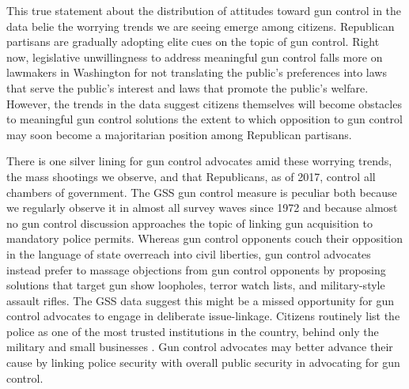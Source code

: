 \documentclass[11pt,]{article}
\begin{document}
This true statement about the distribution of attitudes toward gun
control in the data belie the worrying trends we are seeing emerge among
citizens. Republican partisans are gradually adopting elite cues on the
topic of gun control. Right now, legislative unwillingness to address
meaningful gun control falls more on lawmakers in Washington for not
translating the public's preferences into laws that serve the public's
interest and laws that promote the public's welfare. However, the trends
in the data suggest citizens themselves will become obstacles to
meaningful gun control solutions the extent to which opposition to gun
control may soon become a majoritarian position among Republican
partisans.

There is one silver lining for gun control advocates amid these worrying
trends, the mass shootings we observe, and that Republicans, as of 2017,
control all chambers of government. The GSS gun control measure is
peculiar both because we regularly observe it in almost all survey waves
since 1972 and because almost no gun control discussion approaches the
topic of linking gun acquisition to mandatory police permits. Whereas
gun control opponents couch their opposition in the language of state
overreach into civil liberties, gun control advocates instead prefer to
massage objections from gun control opponents by proposing solutions
that target gun show loopholes, terror watch lists, and military-style
assault rifles. The GSS data suggest this might be a missed opportunity
for gun control advocates to engage in deliberate issue-linkage.
Citizens routinely list the police as one of the most trusted
institutions in the country, behind only the military and small
businesses \citep{gallup2017ci}. Gun control advocates may better
advance their cause by linking police security with overall public
security in advocating for gun control.

\newpage




\newpage
\singlespacing 

\end{document}
